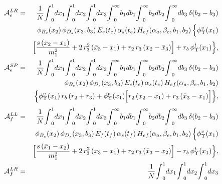 \documentclass[preprint,superscriptaddress,nofootinbib]{revtex4}
\begin{document}
\begin{appendix}
\begin{eqnarray}
  {\cal A}_{e}^{LR} &=& \frac{1}{N}
  {\int}_{0}^{1}dx_{1} {\int}_{0}^{1}dx_{2} {\int}_{0}^{1}dx_{3}
  {\int}_{0}^{\infty}b_{1} db_{1} {\int}_{0}^{\infty}b_{2} db_{2}
  {\int}_{0}^{\infty} db_{3}\, {\delta}(b_{2}-b_{3})
   \nonumber \\ & &
  {\phi}_{B_{c}}(x_{2})\, {\phi}_{D_{s}}(x_{3},b_{3})\,
  E_{e}(t_{e})\,{\alpha}_{s}(t_{e})\,
  H_{ef}({\alpha}_{a},{\beta}_{e},b_{1},b_{2})\,
   \Big\{ {\phi}_{\Upsilon}^{v}(x_{1})
   \nonumber \\ & &
   \Big[ \frac{s\,(x_{2}-x_{1})}{m_{1}^{2}}
   +2\,r_{3}^{2}\, (\bar{x}_{3}-x_{1})
   +r_{2}\,r_{3}\, (x_{2}-\bar{x}_{3}) \Big]
   +r_{b}\,{\phi}_{\Upsilon}^{t}(x_{1}) \Big\}
   \label{amp-fige-02}, \\
  {\cal A}_{e}^{SP} &=& \frac{1}{N}
  {\int}_{0}^{1}dx_{1} {\int}_{0}^{1}dx_{2} {\int}_{0}^{1}dx_{3}
  {\int}_{0}^{\infty}b_{1} db_{1} {\int}_{0}^{\infty}b_{2} db_{2}
  {\int}_{0}^{\infty} db_{3}\, {\delta}(b_{2}-b_{3})
   \nonumber \\ & &
  {\phi}_{B_{c}}(x_{2})\, {\phi}_{D_{s}}(x_{3},b_{3})\,
  E_{e}(t_{e})\,{\alpha}_{s}(t_{e})\,
  H_{ef}({\alpha}_{a},{\beta}_{e},b_{1},b_{2})
   \nonumber \\ & &
   \Big\{ {\phi}_{\Upsilon}^{v}(x_{1})\, r_{b}\,(r_{2}+r_{3})
   +{\phi}_{\Upsilon}^{t}(x_{1}) \Big[ r_{2}\,(x_{2}-x_{1})
   +r_{3}\,(\bar{x}_{3}-x_{1}) \Big] \Big\}
   \label{amp-fige-03},
   \end{eqnarray}
   \begin{eqnarray}
  {\cal A}_{f}^{LL} &=& \frac{1}{N}
  {\int}_{0}^{1}dx_{1} {\int}_{0}^{1}dx_{2} {\int}_{0}^{1}dx_{3}
  {\int}_{0}^{\infty}b_{1} db_{1} {\int}_{0}^{\infty}b_{2} db_{2}
  {\int}_{0}^{\infty} db_{3}\, {\delta}(b_{2}-b_{3})
   \nonumber \\ & &
  {\phi}_{B_{c}}(x_{2})\, {\phi}_{D_{s}}(x_{3},b_{3})\,
  E_{f}(t_{f})\,{\alpha}_{s}(t_{f})\,
  H_{ef}({\alpha}_{a},{\beta}_{e},b_{1},b_{2})\,
   \Big\{ {\phi}_{\Upsilon}^{v}(x_{1})
   \nonumber \\ & &
   \Big[ \frac{s\,(\bar{x}_{1}-x_{2})}{m_{1}^{2}}
   +2\,r_{3}^{2}\,(x_{3}-x_{1})
   +r_{2}\,r_{3}\,(\bar{x}_{3}-x_{2}) \Big]
   -r_{b}\,{\phi}_{\Upsilon}^{t}(x_{1}) \Big\}
   \label{amp-figf-01}, \\
  {\cal A}_{f}^{LR} &=& \frac{1}{N}
  {\int}_{0}^{1}dx_{1} {\int}_{0}^{1}dx_{2} {\int}_{0}^{1}dx_{3}

\end{eqnarray}
\end{appendix}
\end{document}
